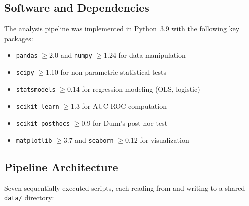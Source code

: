 \documentclass[11pt,a4paper]{article}
\begin{document}
\subsection{Software and Dependencies}

The analysis pipeline was implemented in Python~3.9 with the following key packages:
\begin{itemize}
    \item \texttt{pandas} $\geq$2.0 and \texttt{numpy} $\geq$1.24 for data manipulation
    \item \texttt{scipy} $\geq$1.10 for non-parametric statistical tests
    \item \texttt{statsmodels} $\geq$0.14 for regression modeling (OLS, logistic)
    \item \texttt{scikit-learn} $\geq$1.3 for AUC-ROC computation
    \item \texttt{scikit-posthocs} $\geq$0.9 for Dunn's post-hoc test
    \item \texttt{matplotlib} $\geq$3.7 and \texttt{seaborn} $\geq$0.12 for visualization
\end{itemize}

\subsection{Pipeline Architecture}

Seven sequentially executed scripts, each reading from and writing to a shared \texttt{data/} directory:
\end{document}
